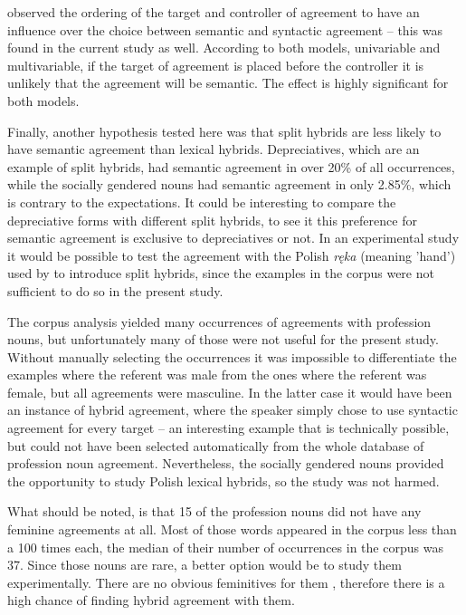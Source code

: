 \cite{corbett_agreement_1979} observed the ordering of the target and controller of agreement to have an influence over the choice between semantic and syntactic agreement -- this was found in the current study as well. According to both models, univariable and multivariable, if the target of agreement is placed before the controller it is unlikely that the agreement will be semantic. The effect is highly significant for both models.

Finally, another hypothesis tested here was that split hybrids are less likely to have semantic agreement than lexical hybrids. Depreciatives, which are an example of split hybrids, had semantic agreement in over 20\% of all occurrences, while the socially gendered nouns had semantic agreement in only 2.85\%, which is contrary to the expectations. It could be interesting to compare the depreciative forms with different split hybrids, to see it this preference for semantic agreement is exclusive to depreciatives or not. In an experimental study it would be possible to test the agreement with the Polish \textsl{ręka} (meaning 'hand') used by \cite{corbett_agreement_2023} to introduce split hybrids, since the examples in the corpus were not sufficient to do so in the present study. 

The corpus analysis yielded many occurrences of agreements with profession nouns, but unfortunately many of those were not useful for the present study. Without manually selecting the occurrences it was impossible to differentiate the examples where the referent was male from the ones where the referent was female, but all agreements were masculine. In the latter case it would have been an instance of hybrid agreement, where the speaker simply chose to use syntactic agreement for every target -- an interesting example that is technically possible, but could not have been selected automatically from the whole database of profession noun agreement. Nevertheless, the socially gendered nouns provided the opportunity to study Polish lexical hybrids, so the study was not harmed.

What should be noted, is that 15 of the profession nouns did not have any feminine agreements at all. Most of those words appeared in the corpus less than a 100 times each, the median of their number of occurrences in the corpus was 37. Since those nouns are rare, a better option would be to study them experimentally. There are no obvious feminitives for them \citep{szpyra-kozlowska_premiera_2019, szpyra-kozlowska_czy_2022}, therefore there is a high chance of finding hybrid agreement with them.
